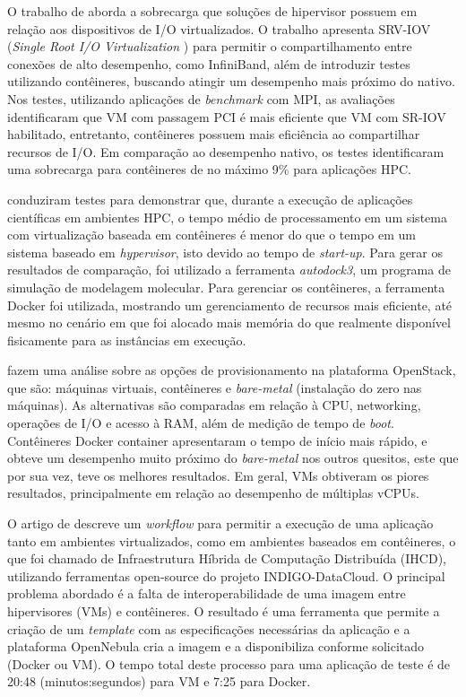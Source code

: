 \documentclass[twoside,english,brazilian]{UNISINOSartigo}
\begin{document}
O trabalho de  aborda a sobrecarga que soluções de hipervisor possuem em relação aos dispositivos de I/O virtualizados. O trabalho apresenta SRV-IOV (\textit{Single Root I/O Virtualization }) para permitir o compartilhamento entre conexões de alto desempenho, como InfiniBand, além de introduzir testes utilizando contêineres, buscando atingir um desempenho mais próximo do nativo. Nos testes, utilizando aplicações de \textit{benchmark} com MPI, as avaliações identificaram que VM com passagem PCI é mais eficiente que VM com SR-IOV habilitado, entretanto, contêineres possuem mais eficiência ao compartilhar recursos de I/O. Em comparação ao desempenho nativo, os testes identificaram uma sobrecarga para contêineres de no máximo 9\% para aplicações HPC.

 conduziram testes para demonstrar que, durante a execução de aplicações científicas em ambientes HPC, o tempo médio de processamento em um sistema com virtualização baseada em contêineres é menor do que o tempo em um sistema baseado em \textit{hypervisor}, isto devido ao tempo de \textit{start-up}. Para gerar os resultados de comparação, foi utilizado a ferramenta \textit{autodock3}, um programa de simulação de modelagem molecular. Para gerenciar os contêineres, a ferramenta Docker foi utilizada, mostrando um gerenciamento de recursos mais eficiente, até mesmo no cenário em que foi alocado mais memória do que realmente disponível fisicamente para as instâncias em execução. 

 fazem uma análise sobre as opções de provisionamento na plataforma OpenStack, que são: máquinas virtuais, contêineres e \textit{bare-metal} (instalação do zero nas máquinas). As alternativas são comparadas em relação à CPU, networking, operações de I/O e acesso à RAM, além de medição de tempo de \textit{boot}. Contêineres Docker container apresentaram o tempo de início mais rápido, e obteve um desempenho muito próximo do \textit{bare-metal} nos outros quesitos, este que por sua vez, teve os melhores resultados. Em geral, VMs obtiveram os piores resultados, principalmente em relação ao desempenho de múltiplas vCPUs.

O artigo de  descreve um \textit{workflow} para permitir a execução de uma aplicação tanto em ambientes virtualizados, como em ambientes baseados em contêineres, o que foi chamado de Infraestrutura Híbrida de Computação Distribuída (IHCD), utilizando ferramentas open-source do projeto INDIGO-DataCloud. O principal problema abordado é a falta de interoperabilidade de uma imagem entre hipervisores (VMs) e contêineres. O resultado é uma ferramenta que permite a criação de um \textit{template} com as especificações necessárias da aplicação e a plataforma OpenNebula cria a imagem e a disponibiliza conforme solicitado (Docker ou VM). O tempo total deste processo para uma aplicação de teste é de 20:48 (minutos:segundos) para VM e 7:25 para Docker.
\end{document}
